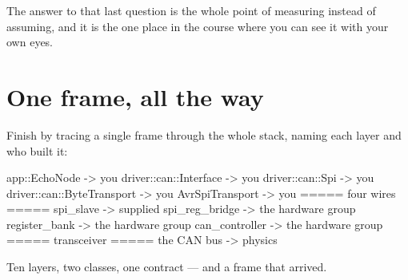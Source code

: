 The answer to that last question is the whole point of measuring instead of assuming, and it is
the one place in the course where you can see it with your own eyes.

\section{One frame, all the way}
\label{sec:endtoend}

Finish by tracing a single frame through the whole stack, naming each layer and who built it:

\begin{console}
app::EchoNode            -> you
driver::can::Interface   -> you
driver::can::Spi         -> you
driver::can::ByteTransport -> you
AvrSpiTransport          -> you
===== four wires =====
spi_slave                -> supplied
spi_reg_bridge           -> the hardware group
register_bank            -> the hardware group
can_controller           -> the hardware group
===== transceiver =====
the CAN bus              -> physics
\end{console}

Ten layers, two classes, one contract --- and a frame that arrived.
